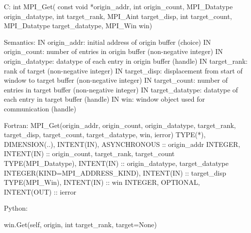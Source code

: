 C:
int MPI_Get(
  const void *origin_addr, int origin_count, MPI_Datatype origin_datatype,
  int target_rank, MPI_Aint target_disp, int target_count, MPI_Datatype target_datatype,
  MPI_Win win)

Semantics:
IN origin_addr: initial address of origin buffer (choice)
IN origin_count: number of entries in origin buffer (non-negative integer)
IN origin_datatype: datatype of each entry in origin buffer (handle)
IN target_rank: rank of target (non-negative integer)
IN target_disp: displacement from start of window to target buffer (non-negative integer)
IN target_count: number of entries in target buffer (non-negative integer)
IN target_datatype: datatype of each entry in target buffer (handle)
IN win: window object used for communication (handle)

Fortran:
MPI_Get(origin_addr, origin_count, origin_datatype,
  target_rank, target_disp, target_count, target_datatype, win, ierror)
TYPE(*), DIMENSION(..), INTENT(IN), ASYNCHRONOUS :: origin_addr
INTEGER, INTENT(IN) :: origin_count, target_rank, target_count
TYPE(MPI_Datatype), INTENT(IN) :: origin_datatype, target_datatype
INTEGER(KIND=MPI_ADDRESS_KIND), INTENT(IN) :: target_disp
TYPE(MPI_Win), INTENT(IN) :: win
INTEGER, OPTIONAL, INTENT(OUT) :: ierror

Python:

win.Get(self, origin, int target_rank, target=None)

